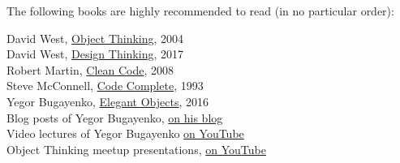 \documentclass[nobrand,anonymous,nodate,nosecurity]{huawei}
\begin{document}
The following books are highly recommended to read (in no particular order):

\begin{multicols}{2}\small\raggedright
{David West}, \ul{Object Thinking}, 2004\\[3pt]
{David West}, \ul{Design Thinking}, 2017\\[3pt]
{Robert Martin}, \ul{Clean Code}, 2008\\[3pt]
{Steve McConnell}, \ul{Code Complete}, 1993\\[3pt]
{Yegor Bugayenko}, \ul{Elegant Objects}, 2016\\[3pt]
Blog posts of Yegor Bugayenko, \href{https://www.yegor256.com/tag/oop}{on his blog}\\[3pt]
Video lectures of Yegor Bugayenko \href{https://www.youtube.com/playlist?list=PLaIsQH4uc08yw2CsNv5OV30GfKE6XVGii}{on YouTube}\\[3pt]
Object Thinking meetup presentations, \href{https://www.youtube.com/watch?v=yT6oO28wEik&list=PLaIsQH4uc08yetzX86w1pPck1QtGEy_ik}{on YouTube}\\[3pt]
\end{multicols}
\end{document}
